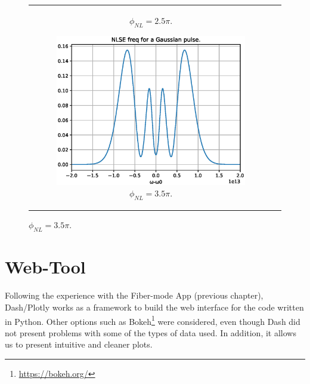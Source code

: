 \begin{figure}[label={fig:spmssfm}, caption={Shape of the spectra for Gaussian pulses by maximum phase shift ($\phi_{NL}$).}]
\begin{tabular}[c]{cc}
\begin{subfigure}[b]{.53\textwidth}
            \caption{$\phi_{NL}= 2.5\pi$.}
            \label{fig:spm25pi}
        \end{subfigure}
        \hfill
        \begin{subfigure}[b]{.53\textwidth}
		    \centering	
            \includegraphics[width=1\linewidth]{figures/chap3/ssfm_spm/3_5pi.eps}
            \caption{$\phi_{NL}= 3.5\pi$.}
            \label{fig:spm35pi}
        \end{subfigure}
        \end{tabular}
        \end{figure}
    
    
    
\section{Web-Tool}
    Following the experience with the Fiber-mode App (previous chapter), Dash/Plotly works as a framework to build the web interface for the code written in Python. Other options such as Bokeh\footnote{\url{https://bokeh.org/}}  were considered, even though Dash did not present problems with some of the types of data used. In addition, it allows us to present intuitive and cleaner plots. 
    
